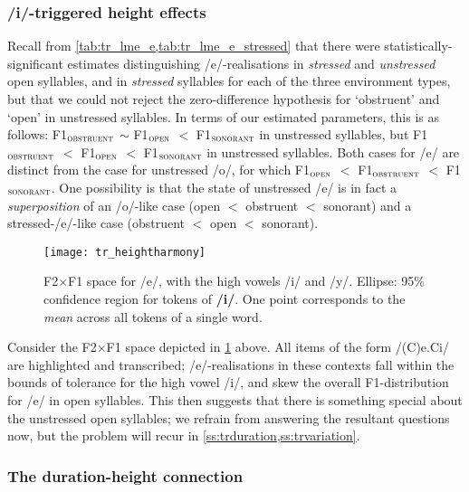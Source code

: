 \subsubsection{/i/-triggered height effects}\label{sss:coarticulation}

Recall from \cref{tab:tr_lme_e,tab:tr_lme_e_stressed} that there were statistically-significant estimates distinguishing /e/-realisations in \emph{stressed} and \emph{unstressed} open syllables, and in \emph{stressed} syllables for each of the three environment types, but that we could not reject the zero-difference hypothesis for `obstruent' and `open' in unstressed syllables. In terms of our estimated parameters, this is as follows: F1$_\textsc{obstruent}$ $\sim$ F1$_\textsc{open}$ $<$ F1$_\textsc{sonorant}$ in unstressed syllables, but F1$_\textsc{obstruent}$ $<$ F1$_\textsc{open}$ $<$ F1$_\textsc{sonorant}$ in unstressed syllables. Both cases for /e/ are distinct from the case for unstressed /o/, for which F1$_\textsc{open}$ $<$ F1$_\textsc{obstruent}$ $<$ F1$_\textsc{sonorant}$. One possibility is that the state of unstressed /e/ is in fact a \emph{superposition} of an /o/-like case (open $<$ obstruent $<$ sonorant) and a stressed-/e/-like case (obstruent $<$ open $<$ sonorant).

\begin{figure}[ht]
  \centering
  \texttt{[image: tr\_heightharmony]}
  \caption[F2$\times$F1 space for /e/ in unstressed open syllables.]{F2$\times$F1 space for /e/, with the high vowels /i/ and /y/. Ellipse: 95\% confidence region for tokens of \textbf{/i/}. One point corresponds to the \emph{mean} across all tokens of a single word.}
  \label{fig:trheightharmony}
\end{figure}

Consider the F2$\times$F1 space depicted in \cref{fig:trheightharmony} above. All items of the form /(C)e.Ci/ are highlighted and transcribed; /e/-realisations in these contexts fall within the bounds of tolerance for the high vowel /i/, and skew the overall F1-distribution for /e/ in open syllables. This then suggests that there is something special about the unstressed open syllables; we refrain from answering the resultant questions now, but the problem will recur in \cref{ss:trduration,ss:trvariation}.

\subsubsection{The duration-height connection}

